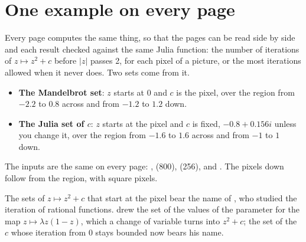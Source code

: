 \section{One example on every page}\label{sec:example}
Every page computes the same thing, so that the pages can be read side by side and each result checked against the
same Julia function: the number of iterations of $z \mapsto z^2 + c$ before $|z|$ passes 2, for each pixel of a
picture, or the most iterations allowed when it never does. Two sets come from it.
\begin{itemize}
  \item \textbf{The Mandelbrot set}: $z$ starts at 0 and $c$ is the pixel, over the region from $-2.2$ to $0.8$
    across and from $-1.2$ to $1.2$ down.
  \item \textbf{The Julia set of $c$}: $z$ starts at the pixel and $c$ is fixed, $-0.8 + 0.156i$ unless you change
    it, over the region from $-1.6$ to $1.6$ across and from $-1$ to $1$ down.
\end{itemize}
The inputs are the same on every page: ,  (800),  (256),  and . The pixels down follow from the region, with square pixels.

The sets of $z \mapsto z^2 + c$ that start at the pixel bear the name of , who studied
the iteration of rational functions.  drew the set of the values of the parameter
for the map $z \mapsto \lambda z(1 - z)$, which a change of variable turns into $z^2 + c$; the set of the $c$ whose
iteration from 0 stays bounded now bears his name.


